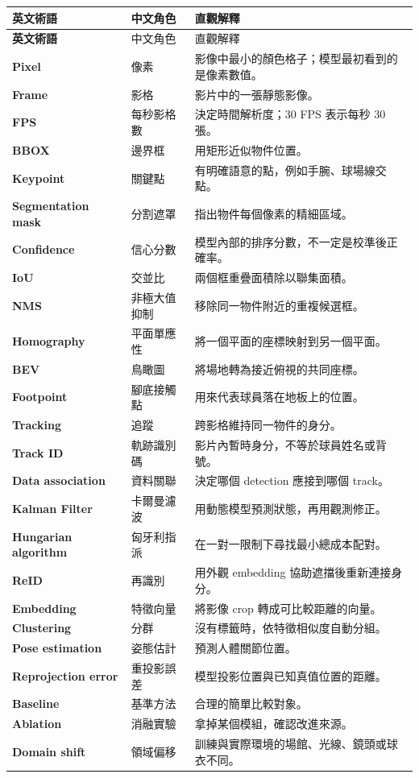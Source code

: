 \documentclass[11pt,a4paper,oneside]{report}
\begin{document}
\begin{longtable}{>{\bfseries}p{3.6cm} p{4.1cm} p{8cm}}
\toprule
英文術語 & 中文角色 & 直觀解釋 \\
\midrule
\endfirsthead
\toprule
英文術語 & 中文角色 & 直觀解釋 \\
\midrule
\endhead
Pixel & 像素 & 影像中最小的顏色格子；模型最初看到的是像素數值。\\
Frame & 影格 & 影片中的一張靜態影像。\\
FPS & 每秒影格數 & 決定時間解析度；30 FPS 表示每秒 30 張。\\
BBOX & 邊界框 & 用矩形近似物件位置。\\
Keypoint & 關鍵點 & 有明確語意的點，例如手腕、球場線交點。\\
Segmentation mask & 分割遮罩 & 指出物件每個像素的精細區域。\\
Confidence & 信心分數 & 模型內部的排序分數，不一定是校準後正確率。\\
IoU & 交並比 & 兩個框重疊面積除以聯集面積。\\
NMS & 非極大值抑制 & 移除同一物件附近的重複候選框。\\
Homography & 平面單應性 & 將一個平面的座標映射到另一個平面。\\
BEV & 鳥瞰圖 & 將場地轉為接近俯視的共同座標。\\
Footpoint & 腳底接觸點 & 用來代表球員落在地板上的位置。\\
Tracking & 追蹤 & 跨影格維持同一物件的身分。\\
Track ID & 軌跡識別碼 & 影片內暫時身分，不等於球員姓名或背號。\\
Data association & 資料關聯 & 決定哪個 detection 應接到哪個 track。\\
Kalman Filter & 卡爾曼濾波 & 用動態模型預測狀態，再用觀測修正。\\
Hungarian algorithm & 匈牙利指派 & 在一對一限制下尋找最小總成本配對。\\
ReID & 再識別 & 用外觀 embedding 協助遮擋後重新連接身分。\\
Embedding & 特徵向量 & 將影像 crop 轉成可比較距離的向量。\\
Clustering & 分群 & 沒有標籤時，依特徵相似度自動分組。\\
Pose estimation & 姿態估計 & 預測人體關節位置。\\
Reprojection error & 重投影誤差 & 模型投影位置與已知真值位置的距離。\\
Baseline & 基準方法 & 合理的簡單比較對象。\\
Ablation & 消融實驗 & 拿掉某個模組，確認改進來源。\\
Domain shift & 領域偏移 & 訓練與實際環境的場館、光線、鏡頭或球衣不同。\\
\bottomrule
\end{longtable}
\end{document}

